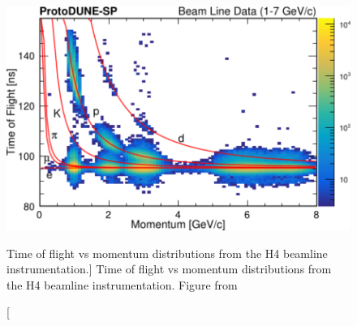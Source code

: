 \begin{figure}

	\centering

	\includegraphics[width=\textwidth]{figures/h4_tof.pdf}

	\caption
	[Time of flight vs momentum distributions from the H4 beamline
	instrumentation.]
	{Time of flight vs momentum distributions from the H4 beamline
	instrumentation. Figure from \cite{protoduneperf}}

	\label{fig:h4_tof}

\end{figure}

